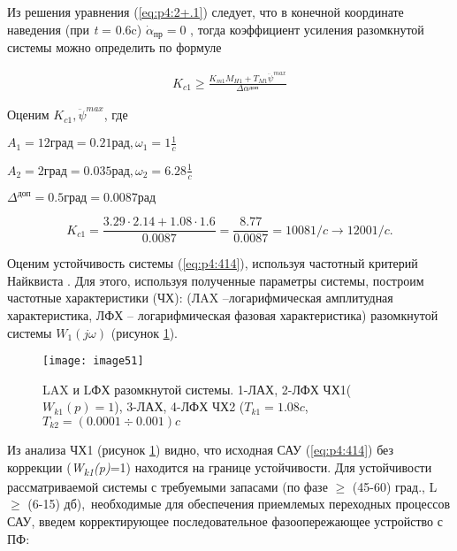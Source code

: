 Из решения уравнения (\ref{eq:p4:2+.1}) следует, что в конечной координате наведения (при \textit{t} = 0.6c)  \( \dot \alpha _{\textit{пр}}=0 \) , тогда коэффициент усиления разомкнутой системы можно определить по формуле \par

\begin{equation}
\label{eq:p4:416}
\begin{alignedat}{2}
K_{c1} \geq \frac{K_{m1}M_{H1}+T_{M1} \ddot \psi ^{max}}{ \Delta  \alpha ^{\textit{доп}}}
\end{alignedat}
\end{equation}

Оценим  \( K_{c1}, \ddot \psi ^{max} \), где 

$A_1 = 12 \textit{град} = 0.21 \textit{рад}, \omega_1 = 1 \frac{1}{c}$

$A_2 = 2 \textit{град} = 0.035 \textit{рад}, \omega_2 = 6.28 \frac{1}{c}$

$\varDelta^{\textit{доп}} =  0.5 \textit{град} = 0.0087 \textit{рад}$

\[ K_{c1}=\frac{3.29 \cdot 2.14 + 1.08 \cdot 1.6}{0.0087} =
\frac{8.77}{0.0087} =
1008 1/c \rightarrow 1200 1/c. \] \par

Оценим устойчивость системы (\ref{eq:p4:414}), используя частотный критерий Найквиста \cite[]{Bessekerski}. Для этого, используя полученные параметры системы, построим частотные характеристики (ЧХ): (ЛAX –логарифмическая амплитудная характеристика, ЛФХ – логарифмическая фазовая характеристика) разомкнутой системы $W_1(j \omega)$ (рисунок \ref{fig:LogAmpChar1}).\par

\begin{figure}[ht]
	\centering
	\texttt{[image: image51]} 
	\caption{LAX и LФХ разомкнутой системы. 1-ЛАХ, 2-ЛФХ ЧХ1($W_{k1}(p)=1 $), 3-ЛАХ, 4-ЛФХ ЧХ2 ($T_{k1} = 1.08 c$, $T_{k2} = (0.0001  \div 0.001) c$}
	\label{fig:LogAmpChar1}
\end{figure}

Из анализа ЧХ1 (рисунок \ref{fig:LogAmpChar1}) видно, что исходная САУ (\ref{eq:p4:414}) без коррекции (\textit{W\textsubscript{k1}(p)}=1) находится на границе устойчивости. Для устойчивости рассматриваемой системы с требуемыми запасами (по фазе  $ \geq $  (45-60) град., L $ \geq $  (6-15) дб),\ необходимые для обеспечения приемлемых переходных процессов САУ, введем корректирующее последовательное фазоопережающее устройство с ПФ:

